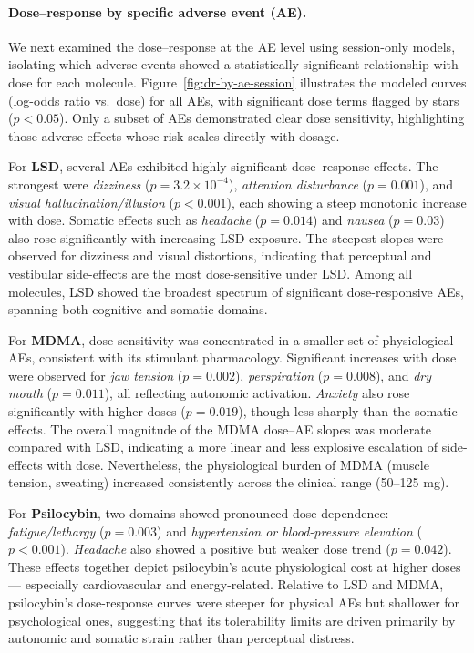 \paragraph{Dose–response by specific adverse event (AE).}
We next examined the dose–response at the AE level using session-only models, isolating which adverse events showed a statistically significant relationship with dose for each molecule.  
Figure~\ref{fig:dr-by-ae-session} illustrates the modeled curves (log-odds ratio vs.\ dose) for all AEs, with significant dose terms flagged by stars ($p<0.05$).  
Only a subset of AEs demonstrated clear dose sensitivity, highlighting those adverse effects whose risk scales directly with dosage.  

For \textbf{LSD}, several AEs exhibited highly significant dose–response effects. The strongest were \textit{dizziness} ($p=3.2\times10^{-4}$), \textit{attention disturbance} ($p=0.001$), and \textit{visual hallucination/illusion} ($p<0.001$), each showing a steep monotonic increase with dose.  
Somatic effects such as \textit{headache} ($p=0.014$) and \textit{nausea} ($p=0.03$) also rose significantly with increasing LSD exposure.  
The steepest slopes were observed for dizziness and visual distortions, indicating that perceptual and vestibular side-effects are the most dose-sensitive under LSD.  
Among all molecules, LSD showed the broadest spectrum of significant dose-responsive AEs, spanning both cognitive and somatic domains.

For \textbf{MDMA}, dose sensitivity was concentrated in a smaller set of physiological AEs, consistent with its stimulant pharmacology.  
Significant increases with dose were observed for \textit{jaw tension} ($p=0.002$), \textit{perspiration} ($p=0.008$), and \textit{dry mouth} ($p=0.011$), all reflecting autonomic activation.  
\textit{Anxiety} also rose significantly with higher doses ($p=0.019$), though less sharply than the somatic effects.  
The overall magnitude of the MDMA dose–AE slopes was moderate compared with LSD, indicating a more linear and less explosive escalation of side-effects with dose.  
Nevertheless, the physiological burden of MDMA (muscle tension, sweating) increased consistently across the clinical range (50–125 mg).

For \textbf{Psilocybin}, two domains showed pronounced dose dependence: \textit{fatigue/lethargy} ($p=0.003$) and \textit{hypertension or blood-pressure elevation} ($p<0.001$).  
\textit{Headache} also showed a positive but weaker dose trend ($p=0.042$).  
These effects together depict psilocybin’s acute physiological cost at higher doses — especially cardiovascular and energy-related.  
Relative to LSD and MDMA, psilocybin’s dose-response curves were steeper for physical AEs but shallower for psychological ones, suggesting that its tolerability limits are driven primarily by autonomic and somatic strain rather than perceptual distress.

